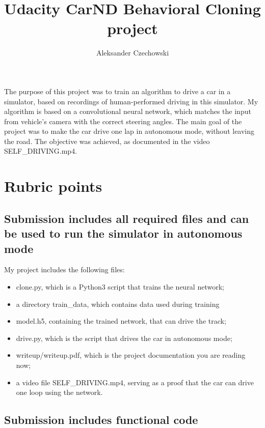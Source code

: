 \documentclass[a4paper,10pt]{article}
\begin{document}
\pagestyle{empty}
\noindent

\title{Udacity CarND Behavioral Cloning project}
\author{Aleksander Czechowski}
\maketitle

The purpose of this project was to train an algorithm to drive a car in a simulator,
based on recordings of human-performed driving in this simulator.
My algorithm is based on a convolutional neural network,
which matches the input from vehicle's camera with the correct steering angles.
The main goal of the project was to make the car drive one lap in autonomous mode, without leaving the road.
The objective was achieved, as documented in the video SELF\_DRIVING.mp4.

\section{Rubric points}

\subsection{Submission includes all required files and can be used to run the simulator in autonomous mode}

My project includes the following files:

\begin{itemize}
  \item clone.py, which is a Python3 script that trains the neural network;
  \item a directory train\_data, which contains data used during training
  \item model.h5, containing the trained network, that can drive the track;
  \item drive.py, which is the script that drives the car in autonomous mode;
  \item writeup/writeup.pdf, which is the project documentation you are reading now;
  \item a video file SELF\_DRIVING.mp4, serving as a proof that the car can drive one loop using the network.
\end{itemize}
 

\subsection{Submission includes functional code}
\end{document}
